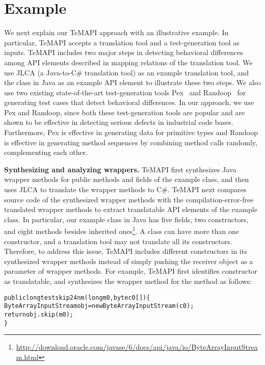 \section{Example}
\label{sec:example}

We next explain our TeMAPI approach with an illustrative example. In particular, TeMAPI accepts a translation tool and a test-generation tool as inputs. TeMAPI includes two major steps in detecting behavioral differences among API elements described in mapping relations of the translation tool. We use JLCA (a Java-to-C\# translation tool) as an example translation tool, and the  class in Java as an example API element to illustrate these two steps. We also use two existing state-of-the-art test-generation tools Pex~\cite{tillmann2008pex} and Randoop~\cite{pacheco2007feedback} for generating test cases that detect behavioral differences. In our approach, we use Pex and Randoop, since both these test-generation tools are popular and are shown to be effective in detecting serious defects in industrial code bases. Furthermore, Pex is effective in generating data for primitive types and Randoop is effective in generating method sequences by combining method calls randomly, complementing each other.


\textbf{Synthesizing and analyzing wrappers.} TeMAPI first synthesizes Java wrapper methods for public methods and fields of the example class, and then uses JLCA to translate the wrapper methods to C\#. TeMAPI next compares source code of the synthesized wrapper methods with the compilation-error-free translated wrapper methods to extract translatable API elements of the example class. In particular, our example class in Java has five fields, two constructors, and eight methods besides inherited ones\footnote{\url{http://download.oracle.com/javase/6/docs/api/java/io/ByteArrayInputStream.html}}. A class can have more than one constructor, and a translation tool may not translate all its constructors. Therefore, to address this issue, TeMAPI includes different constructors in its synthesized wrapper methods instead of simply pushing the receiver object as a parameter of wrapper methods. For example, TeMAPI first identifies  constructor as translatable, and synthesizes the wrapper method for the  method as follows:

\begin{CodeOut}%
\begin{alltt}
public long testskip24nm(long m0, byte c0[])\{
  ByteArrayInputStream obj = new ByteArrayInputStream(c0);
  return obj.skip(m0);
\}
\end{alltt}
\end{CodeOut}%

